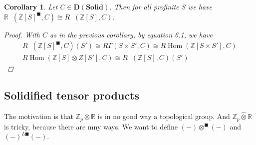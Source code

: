 \documentclass[12pt]{article}
\theoremstyle{darkgreentheorem}
\newtheorem{cor}[thm]{Corollary}
\theoremstyle{darkbluedefinition}
\theoremstyle{darkredexample}
\theoremstyle{remark}
\newcommand{\Z}{\mathbb{Z}}
\newcommand{\R}{\mathbb{R}}
\newcommand{\1}{\mathbbm{1}}
\newcommand{\D}{\mathbf{D}}
\newcommand{\Solid}{\mathbf{Solid}}
\DeclareMathOperator{\Hom}{Hom}
\DeclareMathOperator{\ihom}{\underline{Hom}}
\newcommand{\ot}{\otimes}
\newcommand{\tms}{\times}
\newcommand{\solid}{^{\blacksquare}}
\newcommand{\dsolid}{^{L\blacksquare}}
\begin{document}
\begin{cor}
    Let $C\in \D(\Solid)$.
    Then for all profinite $S$ we have $\R\ihom(\Z[S]\solid,C)\cong R\ihom(\Z[S],C)$.
    \begin{proof}
	With $C$ as in the previous corollary, by equation 6.1, we have
	\begin{multline*}
	    R\ihom(\Z[S]\solid,C)(S')\cong R\Gamma(S\tms S',C)\cong R\Hom(\Z[S\tms S'],C) \\
	    R\Hom(\Z[S]\ot Z[S'],C)\cong R\ihom(\Z[S],C)(S')
	\end{multline*}
    \end{proof}
\end{cor}

\subsection{Solidified tensor products}

The motivation is that $\Z_{p}\ot \R$ is in no good way a topological group.
And $\Z_{p}\hat{\ot}\R$ is tricky, because there are mny ways.
We want to define $(-)\ot\solid (-)$ and $(-)\dsolid(-)$.
\end{document}

